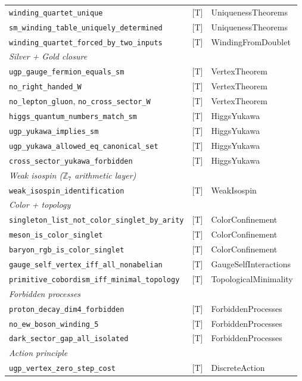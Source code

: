 \documentclass[12pt]{article}
\theoremstyle{remark}
\newcommand{\lean}[1]{\texttt{#1}}
\begin{document}
\begin{longtable}{p{8.5cm}cp{3.5cm}}
\lean{winding\_quartet\_unique} & [T] & UniquenessTheorems \\
\lean{sm\_winding\_table\_uniquely\_determined} & [T] & UniquenessTheorems \\
\lean{winding\_quartet\_forced\_by\_two\_inputs} & [T] & WindingFromDoublet \\[2pt]
%
\multicolumn{3}{l}{\textit{Silver + Gold closure}} \\
\lean{ugp\_gauge\_fermion\_equals\_sm} & [T] & VertexTheorem \\
\lean{no\_right\_handed\_W} & [T] & VertexTheorem \\
\lean{no\_lepton\_gluon}, \lean{no\_cross\_sector\_W} & [T] & VertexTheorem \\
\lean{higgs\_quantum\_numbers\_match\_sm} & [T] & HiggsYukawa \\
\lean{ugp\_yukawa\_implies\_sm} & [T] & HiggsYukawa \\
\lean{ugp\_yukawa\_allowed\_eq\_canonical\_set} & [T] & HiggsYukawa \\
\lean{cross\_sector\_yukawa\_forbidden} & [T] & HiggsYukawa \\[2pt]
%
\multicolumn{3}{l}{\textit{Weak isospin ($\mathbb{Z}_7$ arithmetic layer)}} \\
\lean{weak\_isospin\_identification} & [T] & WeakIsospin \\[2pt]
%
\multicolumn{3}{l}{\textit{Color + topology}} \\
\lean{singleton\_list\_not\_color\_singlet\_by\_arity} & [T] & ColorConfinement \\
\lean{meson\_is\_color\_singlet} & [T] & ColorConfinement \\
\lean{baryon\_rgb\_is\_color\_singlet} & [T] & ColorConfinement \\
\lean{gauge\_self\_vertex\_iff\_all\_nonabelian} & [T] & GaugeSelfInteractions \\
\lean{primitive\_cobordism\_iff\_minimal\_topology} & [T] & TopologicalMinimality \\[2pt]
%
\multicolumn{3}{l}{\textit{Forbidden processes}} \\
\lean{proton\_decay\_dim4\_forbidden} & [T] & ForbiddenProcesses \\
\lean{no\_ew\_boson\_winding\_5} & [T] & ForbiddenProcesses \\
\lean{dark\_sector\_gap\_all\_isolated} & [T] & ForbiddenProcesses \\[2pt]
%
\multicolumn{3}{l}{\textit{Action principle}} \\
\lean{ugp\_vertex\_zero\_step\_cost} & [T] & DiscreteAction \\

\end{longtable}
\end{document}
